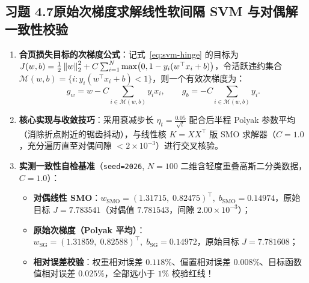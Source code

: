 \subsection*{习题 4.7\quad 原始次梯度求解线性软间隔 SVM 与对偶解一致性校验}
\begin{enumerate}[label=(\arabic*), leftmargin=1.8em]
  \item \textbf{合页损失目标的次梯度公式}：记式~\eqref{eq:svm-hinge} 的目标为 $J(w, b) = \frac{1}{2}\left\|w\right\|_2^2 + C\sum_{i=1}^N \max\!\big(0, 1 - y_i(w^\top x_i + b)\big)$，令活跃违约集合 $\mathcal{M}(w, b) = \{i : y_i(w^\top x_i + b) < 1\}$，则一个有效次梯度为：
  \[
    g_w = w - C\sum_{i \in \mathcal{M}(w, b)} y_i x_i, \qquad
    g_b = -C\sum_{i \in \mathcal{M}(w, b)} y_i.
  \]
  \item \textbf{核心实现与收敛技巧}：采用衰减步长 $\eta_t = \frac{0.05}{\sqrt{t}}$ 配合后半程 Polyak 参数平均（消除折点附近的锯齿抖动），与线性核 $K = X X^\top$ 版 SMO 求解器（$C = 1.0$，充分遍历直至对偶间隙 $< 2\times 10^{-3}$）进行交叉核验。
  \item \textbf{实测一致性自检基准}（\texttt{seed=2026}, $N=100$ 二维含轻度重叠高斯二分类数据，$C = 1.0$）：
  \begin{itemize}
    \item \textbf{对偶线性 SMO}：$w_{\mathrm{SMO}} = (1.31715,\; 0.82475)^\top,\; b_{\mathrm{SMO}} = 0.14974$，原始目标 $J = 7.783541$（对偶值 $7.781543$，间隙 $2.00\times 10^{-3}$）；
    \item \textbf{原始次梯度（Polyak 平均）}：$w_{\mathrm{SG}} = (1.31859,\; 0.82588)^\top,\; b_{\mathrm{SG}} = 0.14972$，原始目标 $J = 7.781608$；
    \item \textbf{相对误差校验}：权重相对误差 $\mathbf{0.118\%}$、偏置相对误差 $\mathbf{0.008\%}$、目标函数值相对误差 $\mathbf{0.025\%}$，全部远小于 $1\%$ 校验红线！
  \end{itemize}
\end{enumerate}

